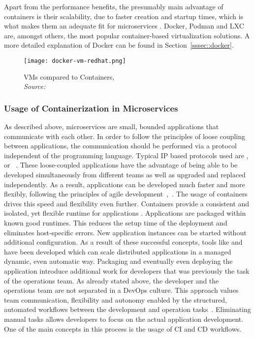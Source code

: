         Apart from the performance benefits, the presumably main advantage of containers is their scalability, due to faster creation and startup times, which is what makes them an adequate fit for microservices \cite{cintainer_scale}. Docker, Podman and LXC are, amongst others, the most popular container-based virtualization solutions. A more detailed explanation of Docker can be found in Section~\ref{sssec::docker}.

        \begin{figure}
            \centering
            \texttt{[image: docker-vm-redhat.png]}
            \caption{\ac{VM}s compared to Containers, \\\textit{Source:~\cite{redhat_pic}}}\label{fig::vm_docker}
        \end{figure}

        \subsubsection{Usage of Containerization in Microservices}
        As described above, microservices are small, bounded applications that communicate with each other. In order to follow the principles of loose coupling between applications, the communication should be performed via a protocol independent of the programming language. Typical IP based protocols used are ,  or ~\cite{micro}. These loose-coupled applications have the advantage of being able to be developed simultaneously from different teams as well as upgraded and replaced independently. As a result, applications can be developed much faster and more flexibly, following the principles of agile development~\cite{micro},~\cite{redhat_micro}.\newline
        The usage of containers drives this speed and flexibility even further. Containers provide a consistent and  isolated, yet flexible runtime for applications \cite{micro_container}. Applications are packaged within known good runtimes. This reduces the setup time of the deployment and eliminates host-specific errors. New application instances can be started without additional configuration. As a result of these successful concepts, tools like  and  have been developed which can scale distributed applications in a managed dynamic, even automatic way.\newline
        Packaging and eventually even deploying the application introduce additional work for developers that was previously the task of the operations team. As already stated above, the developer and the operations team are not separated in a DevOps culture. This approach values team communication, flexibility and autonomy enabled by the structured, automated workflows between the development and operation tasks~\cite{effective_devops}. Eliminating manual tasks allows developers to focus on the actual application development. One of the main concepts in this process is the usage of \ac{CI} and \ac{CD} workflows.

